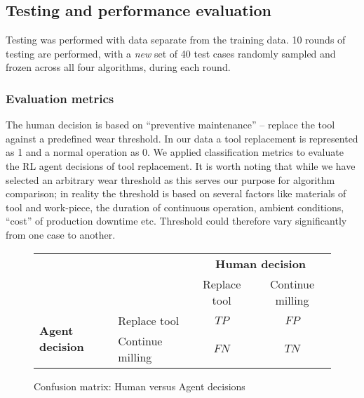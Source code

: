 \documentclass[referee, sn-mathphys-num]{sn-jnl}
\newcommand{\rowspace}[1]{\renewcommand{\arraystretch}{#1}}
\begin{document}
	\subsection{Testing and performance evaluation}
	Testing was performed with data separate from the training data. 10 rounds of testing are performed, with a \textit{new} set of 40 test cases randomly sampled and frozen across all four algorithms, during each round.
	
	\subsubsection*{Evaluation metrics}
	The human decision is based on ``preventive maintenance'' -- replace the tool against a predefined wear threshold. In our data a tool replacement is represented as 1 and a normal operation as 0. We applied classification metrics to evaluate the RL agent decisions of tool replacement. %
	It is worth noting that while we have selected an arbitrary wear threshold as this serves our purpose for algorithm comparison; in reality the threshold is based on several factors like materials of tool and work-piece, the duration of continuous operation, ambient conditions, ``cost'' of production downtime etc. Threshold could therefore vary significantly from one case to another. 
	\begin{figure}[hbt!]
		\begin{center}
			\sffamily
			\rowspace{1.6}
			\begin{tabular}{llcc}
				\multicolumn{2}{c}{}&\multicolumn{2}{c}{\textbf{Human decision}}\\
				\cmidrule(lr){3-4}
				\multicolumn{2}{c}{}&Replace tool&Continue milling\\
				\cmidrule(lr){2-4}
				\multirow{2}{*}{\textbf{Agent decision}}& Replace tool & $TP$& $FP$\\
				\cmidrule(lr){2-4}
				& Continue milling& $FN$& $TN$\\
				\cmidrule(lr){2-4}
			\end{tabular}
		\end{center}
		\caption{Confusion matrix: Human versus Agent decisions}
		\label{fig_CM}	
	\end{figure}
	
\end{document}
